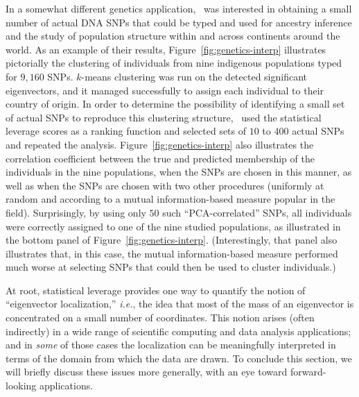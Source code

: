 \documentclass[twoside]{article}
\begin{document}
In a somewhat different genetics application,~\cite{Paschou07b} was 
interested in obtaining a small number of actual DNA SNPs that could be 
typed and used for ancestry inference and the study of population structure 
within and across continents around the world.
As an example of their results,
Figure~\ref{fig:genetics-interp} illustrates pictorially the clustering of 
individuals from nine indigenous populations typed for $9,160$ SNPs. 
$k$-means clustering was run on the detected significant eigenvectors, and 
it managed successfully to assign each individual to their country of origin.
In order to determine the possibility of identifying a small set of 
actual SNPs to reproduce this clustering structure,~\cite{Paschou07b} used 
the statistical leverage scores as a ranking function and selected sets of 
$10$ to $400$ actual SNPs and repeated the analysis.
Figure~\ref{fig:genetics-interp} also illustrates the correlation 
coefficient between the true and predicted membership of the individuals in 
the nine populations, when the SNPs are chosen in this manner, as well as 
when the SNPs are chosen with two other procedures (uniformly at random and 
according to a mutual information-based measure popular in the field).
Surprisingly, by using only $50$ such ``PCA-correlated'' SNPs, all 
individuals were correctly assigned to one of the nine studied populations, 
as illustrated in the bottom panel of Figure~\ref{fig:genetics-interp}. 
(Interestingly, that panel also illustrates that, in this case, the mutual 
information-based measure performed much worse at selecting SNPs that could 
then be used to cluster individuals.)

At root, statistical leverage provides one way to quantify the notion of 
``eigenvector localization,'' \emph{i.e.}, the idea that most of the mass of 
an eigenvector is concentrated on a small number of coordinates.
This notion arises (often indirectly) in a wide range of scientific 
computing and data analysis applications; and in \emph{some} of those cases 
the localization can be meaningfully interpreted in terms of the domain from 
which the data are drawn.
To conclude this section, we will briefly discuss these issues more 
generally, with an eye toward forward-looking applications.
\end{document}
